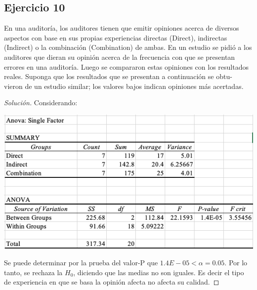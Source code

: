 \documentclass[a4paper,12pt]{article}
\newenvironment{solution}
  {\renewcommand\qedsymbol{$\blacksquare$}\begin{proof}[Solución]}
  {\end{proof}}
\begin{document}
\subsection{Ejercicio 10}
En una auditoría, los auditores tienen que emitir opiniones acerca de diversos aspectos con base en sus propias experiencias directas (Direct), indirectas (Indirect) o la combinación (Combination) de ambas. En un estudio se pidió a los auditores que dieran su opinión acerca de la frecuencia con que se presentan errores en una auditoría. Luego se compararon estas opiniones con los resultados reales. Suponga que los resultados que se presentan a continuación se obtu- vieron de un estudio similar; los valores bajos indican opiniones más acertadas.
\begin{solution}
Considerando: 
\begin{center}
    \includegraphics[scale=0.5]{Imagenes/10.png}
\end{center}
Se puede determinar por la prueba del valor-P que $1.4E-05 < \alpha =0.05$. Por lo tanto, se rechaza la $H_0$, diciendo que las medias no son iguales. Es decir el tipo de experiencia en que se basa la opinión afecta no afecta su calidad.
\end{solution}
\end{document}

